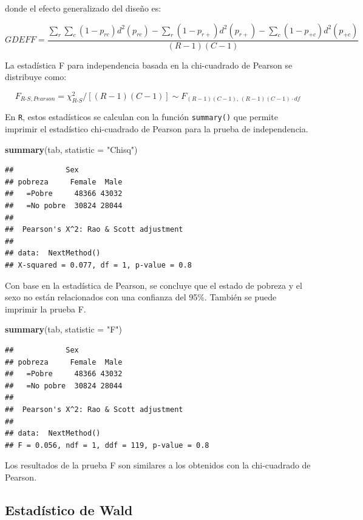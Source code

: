\documentclass[
  spanish,
  12pt,
]{book}
\newenvironment{Shaded}{\begin{snugshade}}{\end{snugshade}}
\newcommand{\AttributeTok}[1]{\textcolor[rgb]{0.13,0.29,0.53}{#1}}
\newcommand{\FunctionTok}[1]{\textcolor[rgb]{0.13,0.29,0.53}{\textbf{#1}}}
\newcommand{\NormalTok}[1]{#1}
\newcommand{\StringTok}[1]{\textcolor[rgb]{0.31,0.60,0.02}{#1}}
\begin{document}
donde el efecto generalizado del diseño es:

\[
GDEFF = \frac{\sum_r \sum_c (1-p_{rc}) d^2(p_{rc}) - \sum_r (1-p_{r+}) d^2(p_{r+}) - \sum_c (1-p_{+c}) d^2(p_{+c})}{(R-1)(C-1)}
\]

La estadística F para independencia basada en la chi-cuadrado de Pearson se distribuye como:

\[
F_{R\text{-}S, Pearson} = \chi_{R\text{-}S}^2 \big/ [(R-1)(C-1)] \sim F_{(R-1)(C-1),\, (R-1)(C-1) \cdot df}
\]

En \texttt{R}, estos estadísticos se calculan con la función \texttt{summary()} que permite imprimir el estadístico chi-cuadrado de Pearson para la prueba de independencia.

\begin{Shaded}
\begin{Highlighting}[]
\FunctionTok{summary}\NormalTok{(tab, }\AttributeTok{statistic =} \StringTok{"Chisq"}\NormalTok{)}
\end{Highlighting}
\end{Shaded}

\begin{verbatim}
##            Sex
## pobreza     Female  Male
##   =Pobre     48366 43032
##   =No pobre  30824 28044
## 
##  Pearson's X^2: Rao & Scott adjustment
## 
## data:  NextMethod()
## X-squared = 0.077, df = 1, p-value = 0.8
\end{verbatim}

Con base en la estadística de Pearson, se concluye que el estado de pobreza y el sexo no están relacionados con una confianza del 95\%. También se puede imprimir la prueba F.

\begin{Shaded}
\begin{Highlighting}[]
\FunctionTok{summary}\NormalTok{(tab, }\AttributeTok{statistic =} \StringTok{"F"}\NormalTok{) }
\end{Highlighting}
\end{Shaded}

\begin{verbatim}
##            Sex
## pobreza     Female  Male
##   =Pobre     48366 43032
##   =No pobre  30824 28044
## 
##  Pearson's X^2: Rao & Scott adjustment
## 
## data:  NextMethod()
## F = 0.056, ndf = 1, ddf = 119, p-value = 0.8
\end{verbatim}

Los resultados de la prueba F son similares a los obtenidos con la chi-cuadrado de Pearson.

\subsection{Estadístico de Wald}\label{sec-wald}
\end{document}
